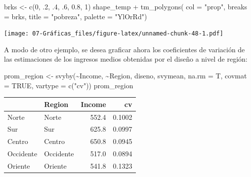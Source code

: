 \documentclass[
  12pt,
]{book}
\newenvironment{Shaded}{\begin{snugshade}}{\end{snugshade}}
\newcommand{\AttributeTok}[1]{\textcolor[rgb]{0.77,0.63,0.00}{#1}}
\newcommand{\ConstantTok}[1]{\textcolor[rgb]{0.00,0.00,0.00}{#1}}
\newcommand{\DecValTok}[1]{\textcolor[rgb]{0.00,0.00,0.81}{#1}}
\newcommand{\FloatTok}[1]{\textcolor[rgb]{0.00,0.00,0.81}{#1}}
\newcommand{\FunctionTok}[1]{\textcolor[rgb]{0.00,0.00,0.00}{#1}}
\newcommand{\NormalTok}[1]{#1}
\newcommand{\OtherTok}[1]{\textcolor[rgb]{0.56,0.35,0.01}{#1}}
\newcommand{\SpecialCharTok}[1]{\textcolor[rgb]{0.00,0.00,0.00}{#1}}
\newcommand{\StringTok}[1]{\textcolor[rgb]{0.31,0.60,0.02}{#1}}
\begin{document}
\begin{Shaded}
\begin{Highlighting}[]
\NormalTok{brks }\OtherTok{\textless{}{-}} \FunctionTok{c}\NormalTok{(}\DecValTok{0}\NormalTok{, .}\DecValTok{2}\NormalTok{, .}\DecValTok{4}\NormalTok{, .}\DecValTok{6}\NormalTok{, }\FloatTok{0.8}\NormalTok{, }\DecValTok{1}\NormalTok{)}
\NormalTok{shape\_temp }\SpecialCharTok{+} \FunctionTok{tm\_polygons}\NormalTok{(}
  \AttributeTok{col =} \StringTok{"prop"}\NormalTok{,              }
  \AttributeTok{breaks =}\NormalTok{ brks,        }
  \AttributeTok{title =} \StringTok{"pobreza"}\NormalTok{,   }
  \AttributeTok{palette =} \StringTok{"YlOrRd"}\NormalTok{) }
\end{Highlighting}
\end{Shaded}

\texttt{[image: 07-Gráficas\_files/figure-latex/unnamed-chunk-48-1.pdf]}

A modo de otro ejemplo, se desea graficar ahora los coeficientes de variación de las estimaciones de los ingresos medios obtenidas por el diseño a nivel de región:

\begin{Shaded}
\begin{Highlighting}[]
\NormalTok{prom\_region }\OtherTok{\textless{}{-}} \FunctionTok{svyby}\NormalTok{(}\SpecialCharTok{\textasciitilde{}}\NormalTok{Income, }\SpecialCharTok{\textasciitilde{}}\NormalTok{Region, diseno,}
\NormalTok{  svymean,}
  \AttributeTok{na.rm =}\NormalTok{ T, }\AttributeTok{covmat =} \ConstantTok{TRUE}\NormalTok{,}
  \AttributeTok{vartype =} \FunctionTok{c}\NormalTok{(}\StringTok{"cv"}\NormalTok{))}
\NormalTok{prom\_region}
\end{Highlighting}
\end{Shaded}

\begin{tabular}{l|l|r|r}
\hline
  & Region & Income & cv\\
\hline
Norte & Norte & 552.4 & 0.1002\\
\hline
Sur & Sur & 625.8 & 0.0997\\
\hline
Centro & Centro & 650.8 & 0.0945\\
\hline
Occidente & Occidente & 517.0 & 0.0894\\
\hline
Oriente & Oriente & 541.8 & 0.1323\\
\hline
\end{tabular}
\end{document}
